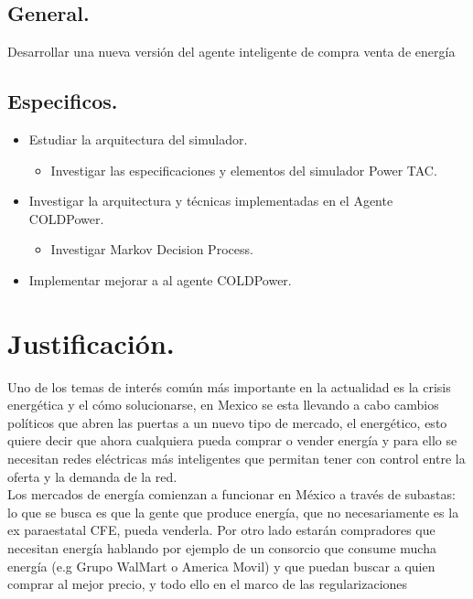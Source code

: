 \subsection{General.}
Desarrollar una nueva versión del agente inteligente de compra venta de energía
\subsection{Especificos.}
\begin{itemize}
    \item Estudiar la arquitectura del simulador. 
    \begin{itemize}
        \item Investigar las especificaciones y elementos del simulador Power TAC.
    \end{itemize} 
    \item Investigar la arquitectura y técnicas implementadas en el Agente COLDPower.
    \begin{itemize}
        \item Investigar Markov Decision Process.
    \end{itemize}
    \item Implementar mejorar a al agente COLDPower.
\end{itemize}

\section{Justificación.}
Uno de los temas de interés común más importante en la actualidad es la crisis energética y el cómo solucionarse, en Mexico se esta llevando a cabo cambios políticos que abren las puertas a un nuevo tipo de mercado, el energético, esto quiere decir que ahora cualquiera pueda comprar o vender energía y para ello se necesitan redes eléctricas más inteligentes que permitan tener con control entre la oferta y la demanda de la red.
\\

Los mercados de energía comienzan a funcionar  en México a través de subastas: lo que se busca es que la gente que produce energía, que no necesariamente es la ex paraestatal CFE, pueda venderla. Por otro lado estarán compradores  que necesitan energía hablando por ejemplo de un consorcio que consume mucha energía (e.g Grupo WalMart o America Movil) y que puedan buscar a quien comprar al mejor precio, y todo ello en el marco de las regularizaciones

